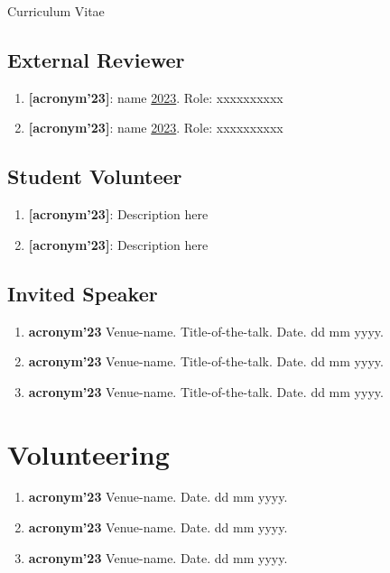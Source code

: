 \documentclass[11pt,a4paper]{article}
\begin{document}
\begin{cv}{Curriculum Vitae}
\subsection{External Reviewer}
\begin{cvlist}{} 
\item \begin{enumerate}[leftmargin=-2cm]
        \item \textbf{[acronym'23]}: name  \href{about:blank}{2023}. Role: xxxxxxxxxx
        \item \textbf{[acronym'23]}: name  \href{about:blank}{2023}. Role: xxxxxxxxxx
    \end{enumerate}
\end{cvlist}
\subsection{Student Volunteer}
\begin{cvlist}{}
\item \begin{enumerate}[leftmargin=-2cm]
        \item \textbf{[acronym'23]}: Description here
        \item \textbf{[acronym'23]}: Description here
\end{enumerate}

\end{cvlist}
\subsection{Invited Speaker}
\begin{enumerate}%
    \item \textbf{acronym'23} Venue-name. Title-of-the-talk. Date. dd mm yyyy.
    \item \textbf{acronym'23} Venue-name. Title-of-the-talk. Date. dd mm yyyy.
    \item \textbf{acronym'23} Venue-name. Title-of-the-talk. Date. dd mm yyyy.

\end{enumerate}

\section{Volunteering}
\begin{enumerate}%
    \item \textbf{acronym'23} Venue-name. Date. dd mm yyyy.
    \item \textbf{acronym'23} Venue-name. Date. dd mm yyyy.
    \item \textbf{acronym'23} Venue-name. Date. dd mm yyyy.
\end{enumerate}


\end{cv}
\end{document}
